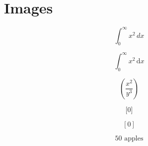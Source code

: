 \documentclass[12pt,twoside,a4paper]{article}
\begin{document}
\section{Images}

\setlength\fboxrule{6pt}
\setlength\fboxsep{0pt}


\[ \int_0^\infty x^2\,dx \]

\[ \int_0^\infty x^2\,\mathrm{d}x\]

\[  \left(\frac{x^2}{y^3}\right) \]

\[ \Bigg[ 0\Bigg] \]

\[ [ 0 ] \]

\[ 50 \text{ apples} \]
\end{document}
